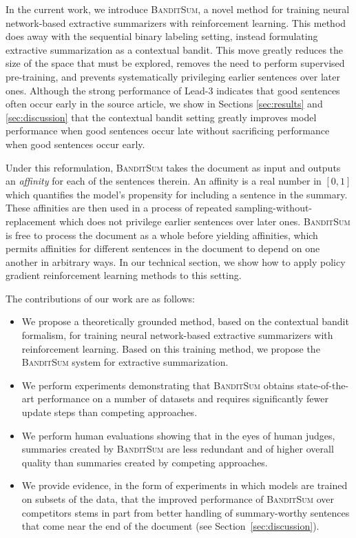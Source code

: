 \documentclass[11pt,a4paper]{article}
\newcommand{\B}{\textsc{BanditSum }}
\begin{document}
In the current work, we introduce \textsc{BanditSum}, a novel method for training neural network-based extractive summarizers with reinforcement learning. This method does away with the sequential binary labeling setting, instead formulating extractive summarization as a contextual bandit. This move greatly reduces the size of the space that must be explored, removes the need to perform supervised pre-training, and prevents systematically privileging earlier sentences over later ones. Although the strong performance of Lead-3 indicates that good sentences often occur early in the source article, we show in Sections \ref{sec:results} and \ref{sec:discussion} that the contextual bandit setting greatly improves model performance when good sentences occur late without sacrificing performance when good sentences occur early.

Under this reformulation, \B takes the document as input and outputs an \textit{affinity} for each of the sentences therein. An affinity is a real number in $[0, 1]$ which quantifies the model's propensity for including a sentence in the summary. These affinities are then used in a process of repeated sampling-without-replacement which does not privilege earlier sentences over later ones. \B is free to process the document as a whole before yielding affinities, which permits affinities for different sentences in the document to depend on one another in arbitrary ways. In our technical section, we show how to apply policy gradient reinforcement learning methods to this setting. 

The contributions of our work are as follows:
\begin{itemize}
\item We propose a theoretically grounded method, based on the contextual bandit formalism, for training neural network-based extractive summarizers with reinforcement learning. Based on this training method, we propose the \B system for extractive summarization.

\item We perform experiments demonstrating that \B obtains state-of-the-art performance on a number of datasets and requires significantly fewer update steps than competing approaches.

\item We perform human evaluations showing that in the eyes of human judges, summaries created by \B are less redundant and of higher overall quality than summaries created by competing approaches.

\item We provide evidence, in the form of experiments in which models are trained on subsets of the data, that the improved performance of \B over competitors stems in part from better handling of summary-worthy sentences that come near the end of the document (see Section~\ref{sec:discussion}).
\end{itemize}
\end{document}
